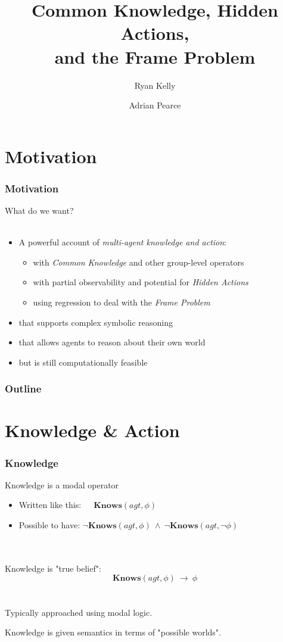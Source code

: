 \documentclass{beamer}
\title{Common Knowledge, Hidden Actions,\\ and the Frame Problem}
\author[Ryan Kelly (rfk@csse.unimelb.edu.au)]{Ryan Kelly \and Adrian Pearce}
\begin{document}
\begin{frame}
  \titlepage
\end{frame}

\section{Motivation}

\begin{frame}
\frametitle{Motivation}
What do we want?\ \\
\ \\
\begin{itemize}
\item A powerful account of \emph{multi-agent knowledge and action}:
  \begin{itemize}
    \item with \emph{Common Knowledge} and other group-level operators
    \item with partial observability and potential for \emph{Hidden Actions}
    \item using regression to deal with the \emph{Frame Problem}
  \end{itemize}
\item that supports complex symbolic reasoning
\item that allows agents to reason about their own world
\item but is still computationally feasible
\end{itemize}
\end{frame}

\begin{frame}
  \frametitle{Outline}
  \tableofcontents
\end{frame}

\section{Knowledge \& Action}

\begin{frame}
\frametitle{Knowledge}

Knowledge is a modal operator
\begin{itemize}
\item Written like this:\ \ \  $\mathbf{Knows}(agt,\phi)$
\item Possible to have: $\neg\mathbf{Knows}(agt,\phi)\ \wedge\ \neg\mathbf{Knows}(agt,\neg\phi)$
\end{itemize}
\ \\
\ \\
Knowledge is "true belief":
\[ \mathbf{Knows}(agt,\phi)\ \rightarrow\ \phi \]
\ \\
\ \\
Typically approached using modal logic.

Knowledge is given semantics in terms of "possible worlds".

\end{frame}
\end{document}
